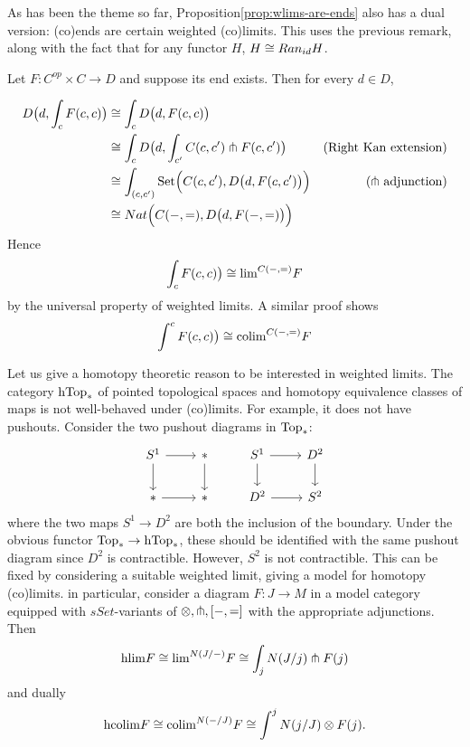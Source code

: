 \begin{remark}
    As has been the theme so far, Proposition\autoref{prop:wlims-are-ends} also has a dual version: (co)ends are certain weighted (co)limits. This uses the previous remark, along with the fact that for any functor $H$, $H\cong Ran_{id}H$.
    
    Let $F:C^{op}\times C\rightarrow D$ and suppose its end exists. Then for every $d\in D$, 
    
    \begin{align*}D\big(d,\int_cF(c,c)\big)&\cong \int_c D\big(d,F(c,c)\big)\\
    &\cong \int_cD\big(d,\int_{c'}C(c,c')\pitchfork F(c,c')\big)&\text{(Right Kan extension)}\\
    &\cong \int_{(c,c')}{\text{Set}}\Big(C(c,c'),D\big(d, F(c,c')\big)\Big)&\text{($\pitchfork$ adjunction)}\\
    &\cong Nat\Big(C(-,=),D\big(d,F(-,=)\big)\Big)
    \end{align*}
    Hence $$\int_cF(c,c)\big)\cong \text{lim}^{C(-,=)}F$$ by the universal property of weighted limits. A similar proof shows
    $$\int^cF(c,c)\big)\cong \text{colim}^{C(-,=)}F$$
\end{remark}

Let us give a homotopy theoretic reason to be interested in weighted limits. The category ${\text{hTop}}_*$ of pointed topological spaces and homotopy equivalence classes of maps is not well-behaved under (co)limits. For example, it does not have pushouts. Consider the two pushout diagrams in ${\text{Top}}_*$:
\[\begin{tikzcd}
S^1 \arrow[r] \arrow[d] & * \arrow[d] & S^1 \arrow[r] \arrow[d] & D^2 \arrow[d] \\
* \arrow[r]             & *           & D^2 \arrow[r]           & S^2          
\end{tikzcd}\]
where the two maps $S^1\rightarrow D^2$ are both the inclusion of the boundary. Under the obvious functor ${\text{Top}}_*\rightarrow {\text{hTop}}_*$, these should be identified with the same pushout diagram since $D^2$ is contractible. However, $S^2$ is not contractible. This can be fixed by considering a suitable weighted limit, giving a model for homotopy (co)limits. in particular, consider a diagram $F:J\rightarrow M$ in a model category equipped with $sSet$-variants of $\otimes,\pitchfork,[-,=]$ with the appropriate adjunctions. Then
$$\text{hlim} F\cong \text{lim}^{N(J/-)}F\cong \int_j N(J/j)\pitchfork F(j)$$ 
and dually
$$\text{hcolim} F\cong \text{colim}^{N(-/J)}F\cong \int^j N(j/J)\otimes F(j).$$ 

